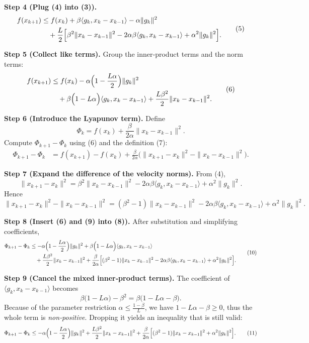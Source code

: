 \documentclass{article}
\begin{document}
\noindent\textbf{Step 4 (Plug (4) into (3)).}  
\[
\begin{aligned}
f(x_{k+1})
&\le f(x_{k})
+\beta\langle g_{k},x_{k}-x_{k-1}\rangle-\alpha\|g_{k}\|^{2}\\
&\quad+\frac{L}{2}\Bigl[\beta^{2}\|x_{k}-x_{k-1}\|^{2}
-2\alpha\beta\langle g_{k},x_{k}-x_{k-1}\rangle
+\alpha^{2}\|g_{k}\|^{2}\Bigr].
\end{aligned}
\tag{5}
\]

\noindent\textbf{Step 5 (Collect like terms).}  
Group the inner‑product terms and the norm terms:
\[
\begin{aligned}
f(x_{k+1})
&\le f(x_{k})
-\alpha\Bigl(1-\frac{L\alpha}{2}\Bigr)\|g_{k}\|^{2}\\
&\quad+\beta\Bigl(1-L\alpha\Bigr)\langle g_{k},x_{k}-x_{k-1}\rangle
+\frac{L\beta^{2}}{2}\|x_{k}-x_{k-1}\|^{2}.
\end{aligned}
\tag{6}
\]

\noindent\textbf{Step 6 (Introduce the Lyapunov term).}  
Define
\[
\Phi_{k}=f(x_{k})+\frac{\beta}{2\alpha}\|x_{k}-x_{k-1}\|^{2}.
\tag{7}
\]
Compute $\Phi_{k+1}-\Phi_{k}$ using (6) and the definition (7):
\[
\begin{aligned}
\Phi_{k+1}-\Phi_{k}
&=f(x_{k+1})-f(x_{k})
+\frac{\beta}{2\alpha}\bigl(\|x_{k+1}-x_{k}\|^{2}
-\|x_{k}-x_{k-1}\|^{2}\bigr).
\end{aligned}
\tag{8}
\]

\noindent\textbf{Step 7 (Expand the difference of the velocity norms).}  
From (4),
\[
\|x_{k+1}-x_{k}\|^{2}
=\beta^{2}\|x_{k}-x_{k-1}\|^{2}
-2\alpha\beta\langle g_{k},x_{k}-x_{k-1}\rangle
+\alpha^{2}\|g_{k}\|^{2}.
\]
Hence
\[
\|x_{k+1}-x_{k}\|^{2}
-\|x_{k}-x_{k-1}\|^{2}
=(\beta^{2}-1)\|x_{k}-x_{k-1}\|^{2}
-2\alpha\beta\langle g_{k},x_{k}-x_{k-1}\rangle
+\alpha^{2}\|g_{k}\|^{2}.
\tag{9}
\]

\noindent\textbf{Step 8 (Insert (6) and (9) into (8)).}  
After substitution and simplifying coefficients,
\[
\begin{aligned}
\Phi_{k+1}-\Phi_{k}
&\le
-\alpha\Bigl(1-\frac{L\alpha}{2}\Bigr)\|g_{k}\|^{2}
+\beta\Bigl(1-L\alpha\Bigr)\langle g_{k},x_{k}-x_{k-1}\rangle\\
&\quad+\frac{L\beta^{2}}{2}\|x_{k}-x_{k-1}\|^{2}
+\frac{\beta}{2\alpha}\Bigl[(\beta^{2}-1)\|x_{k}-x_{k-1}\|^{2}
-2\alpha\beta\langle g_{k},x_{k}-x_{k-1}\rangle
+\alpha^{2}\|g_{k}\|^{2}\Bigr].
\end{aligned}
\tag{10}
\]

\noindent\textbf{Step 9 (Cancel the mixed inner‑product terms).}  
The coefficient of $\langle g_{k},x_{k}-x_{k-1}\rangle$ becomes
\[
\beta\bigl(1-L\alpha\bigr)-\beta^{2}
=\beta\bigl(1-L\alpha-\beta\bigr).
\]
Because of the parameter restriction $\alpha\le\frac{1-\beta}{L}$, we have $1-L\alpha-\beta\ge0$, thus the whole term is \emph{non‑positive}. Dropping it yields an inequality that is still valid:
\[
\Phi_{k+1}-\Phi_{k}
\le
-\alpha\Bigl(1-\frac{L\alpha}{2}\Bigr)\|g_{k}\|^{2}
+\frac{L\beta^{2}}{2}\|x_{k}-x_{k-1}\|^{2}
+\frac{\beta}{2\alpha}\Bigl[(\beta^{2}-1)\|x_{k}-x_{k-1}\|^{2}
+\alpha^{2}\|g_{k}\|^{2}\Bigr].
\tag{11}
\]
\end{document}
